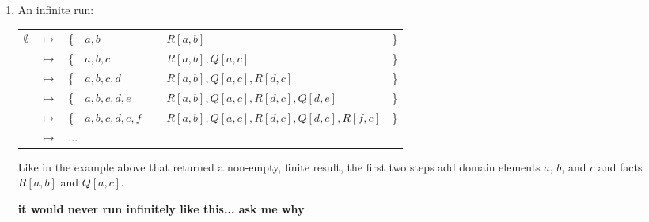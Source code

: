 \begin{enumerate}
		\item An infinite run:

			\begin{tabular}{lllllll}
				$\emptyset$ & $\mapsto$ & \{ & $a,b$         & $|$ & $R[a,b]$                                 & \} \\
				{}          & $\mapsto$ & \{ & $a,b,c$       & $|$ & $R[a,b], Q[a,c]$                         & \} \\
				{}          & $\mapsto$ & \{ & $a,b,c,d$     & $|$ & $R[a,b], Q[a,c], R[d,c]$                 & \} \\
				{}          & $\mapsto$ & \{ & $a,b,c,d,e$   & $|$ & $R[a,b], Q[a,c], R[d,c], Q[d,e]$         & \} \\
				{}          & $\mapsto$ & \{ & $a,b,c,d,e,f$ & $|$ & $R[a,b], Q[a,c], R[d,c], Q[d,e], R[f,e]$ & \} \\
				{}          & $\mapsto$ & \multicolumn{5}{l}{ $\ldots$ } \\
			\end{tabular}

			Like in the example above that returned a non-empty, finite result,
			the first two steps add domain elements $a$, $b$, and $c$ and facts
			$R[a,b]$ and $Q[a,c]$.

			\textbf{it would never run infinitely like this... ask me why}

		\end{enumerate}
